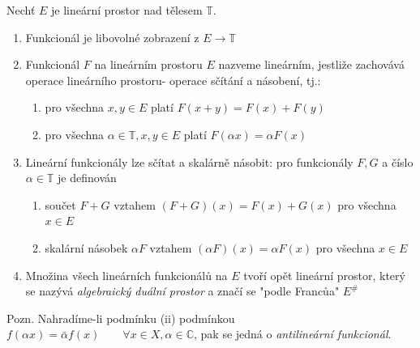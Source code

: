 \begin{definition}
Nechť $E$  je lineární prostor nad tělesem $\mathbb{T}$.
\begin{enumerate}
\item Funkcionál je libovolné zobrazení z $E \rightarrow \mathbb{T}$
\item Funkcionál $F$ na lineárním prostoru $E$ nazveme lineárním, jestliže zachovává operace lineárního prostoru- operace sčítání a násobení, tj.: \begin{enumerate}
\item pro všechna $x,y \in E$ platí $F(x+y)=F(x)+F(y)$
\item pro všechna $\alpha \in \mathbb{T,} x,y \in E$ platí $F(\alpha x)=\alpha F(x)$
\end{enumerate}
\item Lineární funkcionály lze sčítat a skalárně násobit: pro funkcionály $F,G$ a číslo $\alpha \in \mathbb{T}$ je definován \begin{enumerate}
\item součet $F+G$ vztahem $(F+G)(x)=F(x)+G(x) $ pro všechna $x \in E$
\item skalární násobek $\alpha F$ vztahem $(\alpha F)(x)=\alpha F(x) $ pro všechna $x \in E$
\end{enumerate}
\item Množina všech lineárních funkcionálů na $E$ tvoří opět lineární prostor, který se nazývá \textit{algebraický duální prostor} a značí se "podle Francůa"  $E^{\#}$
\end{enumerate}
\end{definition}

Pozn. Nahradíme-li podmínku (ii) podmínkou $f(\alpha x)=\bar{\alpha} f(x) \qquad \forall x \in X,\alpha \in \mathbb{C}$, pak se jedná o \textit{antilineární funkcionál}. 

 

